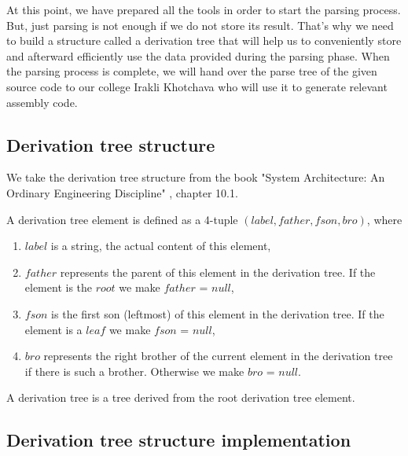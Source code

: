 At this point, we have prepared all the tools in order to start the parsing process. But, just parsing is not enough if we do not store its result. That’s why we need to build a structure called a derivation tree that will help us to conveniently store and afterward efficiently use the data provided during the parsing phase. When the parsing process is complete, we will hand over the parse tree of the given source code to our college Irakli Khotchava who will use it to generate relevant assembly code.

\vspace{10pt}

\subsection{Derivation tree structure}

We take the derivation tree structure from the book "System Architecture: An Ordinary Engineering Discipline" \cite{sysbook}, chapter 10.1.

\begin{definition}[3.0]
    A derivation tree element is defined as a 4-tuple \((label, father, fson, bro)\), where
    \begin{enumerate}
        \item \(label\) is a string, the actual content of this element,
        \item \(father\) represents the parent of this element in the derivation tree. If the element is the \(root\) we make \(father\) = \(null\),
        \item \(fson\) is the first son (leftmost) of this element in the derivation tree. If the element is a \(leaf\) we make \(fson\) = \(null\),
        \item \(bro\) represents the right brother of the current element in the derivation tree if there is such a brother. Otherwise we make \(bro\) = \(null\).
    \end{enumerate}

    A derivation tree is a tree derived from the root derivation tree element.

\end{definition}
\setlength{\parindent}{0pt}

\vspace{10pt}

\subsection{Derivation tree structure implementation}

